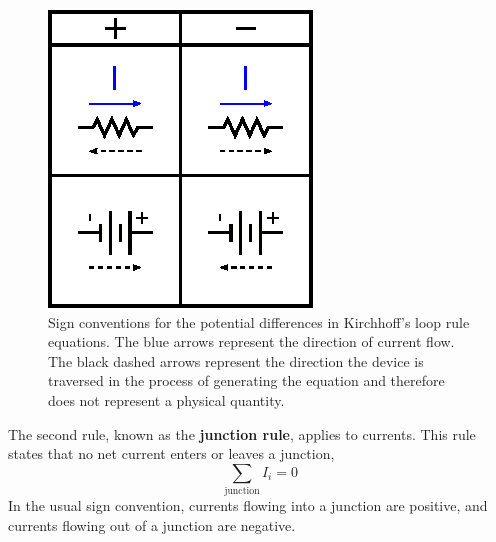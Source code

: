\documentclass[11pt]{article}
\begin{document}
\begin{figure}[ht]
  \begin{center}
     \includegraphics{kirchhoffsigns.eps}
    \caption{Sign conventions for the potential differences in
      Kirchhoff's loop rule equations. The blue arrows represent the
      direction of current flow. The black dashed arrows represent the
      direction the device is traversed in the process of generating
      the equation and therefore does not represent a physical
      quantity.}
    \label{fig:kirchhoffsigns}
  \end{center}
\end{figure}

The second rule, known as the \textbf{junction rule}, applies to
currents. This rule states that no net current enters or leaves a
junction,
\begin{equation}
  \sum_\mathrm{junction} I_i = 0
  \label{eq:junction}
\end{equation}
In the usual sign convention, currents flowing into a junction are
positive, and currents flowing out of a junction are negative.

\begin{latexonly}
  \noindent
  \hrulefill
\end{latexonly}
\htmlrule
\end{document}
